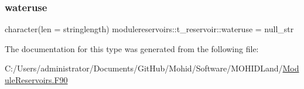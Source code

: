 \mbox{\label{structmodulereservoirs_1_1t__reservoir_a87a1e099a23dffefb04b20c853aee510}} 
\subsubsection{\texorpdfstring{wateruse}{wateruse}}
{\footnotesize\ttfamily character(len = stringlength) modulereservoirs\+::t\+\_\+reservoir\+::wateruse = null\+\_\+str\hspace{0.3cm}{\ttfamily [private]}}



The documentation for this type was generated from the following file\+:\begin{DoxyCompactItemize}
\item 
C\+:/\+Users/administrator/\+Documents/\+Git\+Hub/\+Mohid/\+Software/\+M\+O\+H\+I\+D\+Land/\mbox{\hyperlink{_module_reservoirs_8_f90}{Module\+Reservoirs.\+F90}}\end{DoxyCompactItemize}

